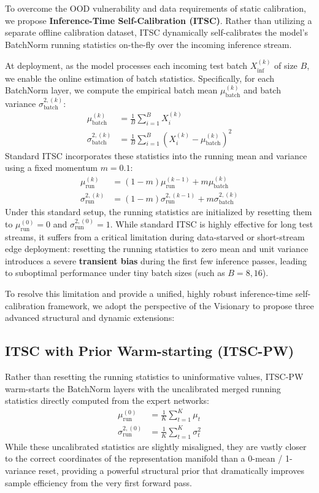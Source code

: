 \documentclass{article}
\theoremstyle{plain}
\theoremstyle{definition}
\theoremstyle{remark}
\begin{document}
To overcome the OOD vulnerability and data requirements of static calibration, we propose \textbf{Inference-Time Self-Calibration (ITSC)}. Rather than utilizing a separate offline calibration dataset, ITSC dynamically self-calibrates the model's BatchNorm running statistics on-the-fly over the incoming inference stream.

At deployment, as the model processes each incoming test batch $X_{\text{inf}}^{(k)}$ of size $B$, we enable the online estimation of batch statistics. Specifically, for each BatchNorm layer, we compute the empirical batch mean $\mu_{\text{batch}}^{(k)}$ and batch variance $\sigma_{\text{batch}}^{2,(k)}$:
\begin{align}
  \mu_{\text{batch}}^{(k)} &= \frac{1}{B} \sum_{i=1}^B X_{i}^{(k)} \\
  \sigma_{\text{batch}}^{2,(k)} &= \frac{1}{B} \sum_{i=1}^B (X_{i}^{(k)} - \mu_{\text{batch}}^{(k)})^2
\end{align}
Standard ITSC incorporates these statistics into the running mean and variance using a fixed momentum $m = 0.1$:
\begin{align}
  \mu_{\text{run}}^{(k)} &= (1 - m) \mu_{\text{run}}^{(k-1)} + m \mu_{\text{batch}}^{(k)} \\
  \sigma_{\text{run}}^{2,(k)} &= (1 - m) \sigma_{\text{run}}^{2,(k-1)} + m \sigma_{\text{batch}}^{2,(k)}
\end{align}
Under this standard setup, the running statistics are initialized by resetting them to $\mu_{\text{run}}^{(0)} = 0$ and $\sigma_{\text{run}}^{2,(0)} = 1$. While standard ITSC is highly effective for long test streams, it suffers from a critical limitation during data-starved or short-stream edge deployment: resetting the running statistics to zero mean and unit variance introduces a severe \textbf{transient bias} during the first few inference passes, leading to suboptimal performance under tiny batch sizes (such as $B=8, 16$).

To resolve this limitation and provide a unified, highly robust inference-time self-calibration framework, we adopt the perspective of the Visionary to propose three advanced structural and dynamic extensions:

\subsection{ITSC with Prior Warm-starting (ITSC-PW)}
Rather than resetting the running statistics to uninformative values, ITSC-PW warm-starts the BatchNorm layers with the uncalibrated merged running statistics directly computed from the expert networks:
\begin{align}
  \mu_{\text{run}}^{(0)} &= \frac{1}{K} \sum_{t=1}^K \mu_t \\
  \sigma_{\text{run}}^{2,(0)} &= \frac{1}{K} \sum_{t=1}^K \sigma_t^2
\end{align}
While these uncalibrated statistics are slightly misaligned, they are vastly closer to the correct coordinates of the representation manifold than a 0-mean / 1-variance reset, providing a powerful structural prior that dramatically improves sample efficiency from the very first forward pass.
\end{document}
